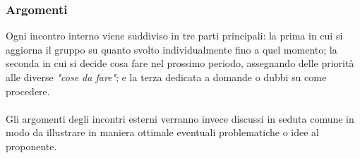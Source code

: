 \subsubsection{Argomenti}
Ogni incontro interno viene suddiviso in tre parti principali: la prima in cui si aggiorna il gruppo su quanto svolto individualmente fino a quel momento; la seconda in cui si decide cosa fare nel prossimo periodo, assegnando delle priorità alle diverse \textit{"cose da fare"}; e la terza dedicata a domande o dubbi su come procedere.
\\ \\
Gli argomenti degli incontri esterni verranno invece discussi in seduta comune in modo da illustrare in maniera ottimale eventuali problematiche o idee al proponente.